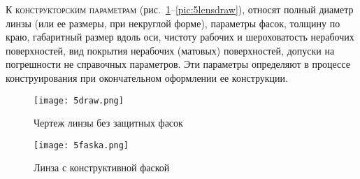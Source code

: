 К \textsc{конструкторским параметрам} (рис.~\ref{pic:5draw}--\ref{pic:5lensdraw}), относят полный диаметр линзы (или ее размеры, при некруглой форме), параметры фасок, толщину по краю, габаритный размер вдоль оси, чистоту рабочих и шероховатость нерабочих поверхностей, вид покрытия нерабочих (матовых) поверхностей, допуски на погрешности не справочных параметров. Эти параметры определяют в процессе конструирования при окончательном оформлении ее конструкции.

\begin{figure}[h!]
	\texttt{[image: 5draw.png]}
	\caption{Чертеж линзы без защитных фасок}
	\label{pic:5draw}
\end{figure}

\begin{figure}[h!]
	\texttt{[image: 5faska.png]}
	\caption{Линза с конструктивной фаской}
	\label{pic:5faska}
\end{figure}

